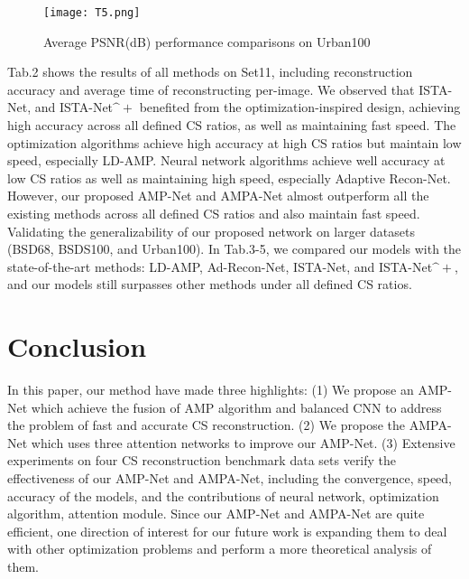 \documentclass[conference]{IEEEtran}
\begin{document}
\begin{figure}[ht]
\centering
\caption{Average PSNR(dB) performance comparisons on Urban100}
\texttt{[image: T5.png]}
\label{tab:T5}
\end{figure}
Tab.2 shows the results of all methods on Set11, including reconstruction accuracy and average time of reconstructing per-image. We observed that ISTA-Net, and ISTA-Net$\bm^{+}$ benefited from the optimization-inspired design, achieving high accuracy across all defined CS ratios, as well as maintaining fast speed. The optimization algorithms achieve high accuracy at high CS ratios but maintain low speed, especially LD-AMP. Neural network algorithms achieve well accuracy at low CS ratios as well as maintaining high speed, especially Adaptive Recon-Net. However, our proposed AMP-Net and AMPA-Net almost outperform all the existing methods across all defined CS ratios and also maintain fast speed. Validating the generalizability of our proposed network on larger datasets (BSD68, BSDS100, and Urban100). In Tab.3-5, we compared our models with the state-of-the-art methods: LD-AMP, Ad-Recon-Net, ISTA-Net, and ISTA-Net$\bm^{+}$, and our models still surpasses other methods under all defined CS ratios.
\section{Conclusion}
In this paper, our method have made three highlights: (1) We propose an AMP-Net which achieve the fusion of AMP algorithm and balanced CNN to address the problem of fast and accurate CS reconstruction. (2) We propose the AMPA-Net which uses three attention networks to improve our AMP-Net. (3) Extensive experiments on four CS reconstruction benchmark data sets verify the effectiveness of our AMP-Net and AMPA-Net, including the convergence, speed, accuracy of the models, and the contributions of neural network, optimization algorithm, attention module. Since our AMP-Net and AMPA-Net are quite efficient, one direction of interest for our future work is expanding them to deal with other optimization problems and perform a more theoretical analysis of them.
\end{document}
